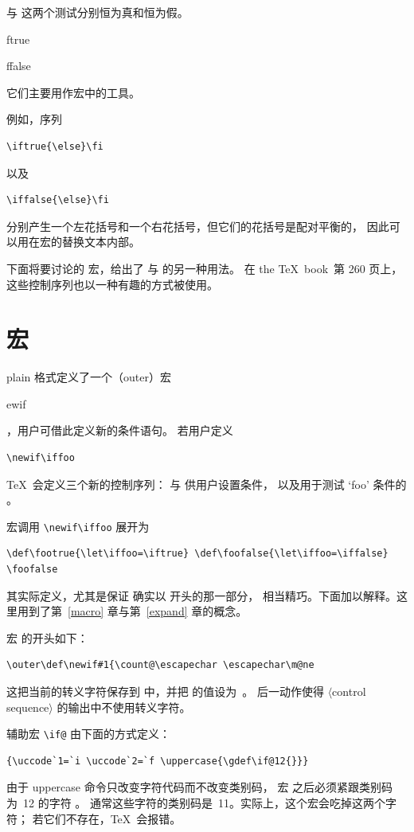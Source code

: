 \documentclass[a4paper]{rapport3}
\makeatletter
\def\gr#1{$\langle$#1$\rangle$}\def\key#1{{\tt#1}}
\def\TeXbook{the \TeX\ book}\def\web{{\sc web}}
\def\cstoidx#1\par{\index{#1@\cs{#1}}}
\def\csidx#1{\cstoidx #1\par\cs{#1}}
\makeatother
\begin{document}
 与  这两个测试分别恒为真和恒为假。
\cstoidx iftrue\par\cstoidx iffalse\par
它们主要用作宏中的工具。

例如，序列
\begin{verbatim}
\iftrue{\else}\fi
\end{verbatim}
以及
\begin{verbatim}
\iffalse{\else}\fi
\end{verbatim}
分别产生一个左花括号和一个右花括号，但它们的花括号是配对平衡的，
因此可以用在宏的替换文本内部。

下面将要讨论的  宏，给出了  与  的另一种用法。
在 \TeXbook\ 第 260 页上，这些控制序列也以一种有趣的方式被使用。

\section{\protect{} 宏}
\label{newif:def}

plain 格式定义了一个（outer）宏 \csidx{newif}，用户可借此定义新的条件语句。
若用户定义 \begin{verbatim}
\newif\iffoo
\end{verbatim}
\TeX\ 会定义三个新的控制序列：
 与  供用户设置条件，
以及用于测试 `foo' 条件的 。

宏调用 \verb-\newif\iffoo- 展开为
\begin{verbatim}
\def\footrue{\let\iffoo=\iftrue} \def\foofalse{\let\iffoo=\iffalse}
\foofalse
\end{verbatim}
其实际定义，尤其是保证  确实以  开头的那一部分，
相当精巧。下面加以解释。这里用到了第~\ref{macro} 章与第~\ref{expand} 章的概念。

宏  的开头如下：
\begin{verbatim}
\outer\def\newif#1{\count@\escapechar \escapechar\m@ne
\end{verbatim}
这把当前的转义字符保存到  中，并把  的值设为~。
后一动作使得 \gr{control sequence} 的输出中不使用转义字符。

辅助宏 \verb>\if@> 由下面的方式定义：
\begin{verbatim}
{\uccode`1=`i \uccode`2=`f \uppercase{\gdef\if@12{}}}
\end{verbatim}
由于 uppercase 命令只改变字符代码而不改变类别码，
宏  之后必须紧跟类别码为~12 的字符 。
通常这些字符的类别码是~11。实际上，这个宏会吃掉这两个字符；
若它们不存在，\TeX\ 会报错。
\end{document}
